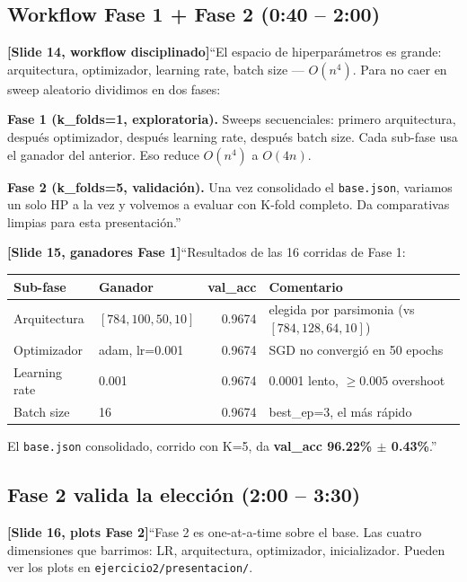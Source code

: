 \documentclass[11pt,a4paper]{article}
\newcommand{\code}[1]{\texttt{\textcolor{accent}{#1}}}
\newcommand{\file}[1]{\texttt{\small #1}}
\newcommand{\slidenum}[1]{\textcolor{accent}{\textbf{[Slide #1]}}}
\newcommand{\timing}[1]{\textcolor{muted}{\small (#1)}}
\begin{document}
\subsection{Workflow Fase 1 + Fase 2 \timing{0:40 -- 2:00}}

\slidenum{14, workflow disciplinado}\quad ``El espacio de hiperparámetros es grande: arquitectura, optimizador, learning rate, batch size --- $O(n^4)$. Para no caer en sweep aleatorio dividimos en dos fases:

\textbf{Fase 1 (k\_folds=1, exploratoria).} Sweeps secuenciales: primero arquitectura, después optimizador, después learning rate, después batch size. Cada sub-fase usa el ganador del anterior. Eso reduce $O(n^4)$ a $O(4n)$.

\textbf{Fase 2 (k\_folds=5, validación).} Una vez consolidado el \code{base.json}, variamos un solo HP a la vez y volvemos a evaluar con K-fold completo. Da comparativas limpias para esta presentación.''

\slidenum{15, ganadores Fase 1}\quad ``Resultados de las 16 corridas de Fase 1:

\begin{center}
\small
\begin{tabular}{@{}llrl@{}}
\toprule
Sub-fase & Ganador & val\_acc & Comentario \\
\midrule
Arquitectura  & $[784,100,50,10]$ & 0.9674 & elegida por parsimonia (vs $[784,128,64,10]$) \\
Optimizador   & adam, lr=0.001    & 0.9674 & SGD no convergió en 50 epochs \\
Learning rate & 0.001             & 0.9674 & 0.0001 lento, $\geq 0.005$ overshoot \\
Batch size    & 16                & 0.9674 & best\_ep=3, el más rápido \\
\bottomrule
\end{tabular}
\end{center}

El \code{base.json} consolidado, corrido con K=5, da \textbf{val\_acc 96.22\% $\pm$ 0.43\%}.''

\subsection{Fase 2 valida la elección \timing{2:00 -- 3:30}}

\slidenum{16, plots Fase 2}\quad ``Fase 2 es one-at-a-time sobre el base. Las cuatro dimensiones que barrimos: LR, arquitectura, optimizador, inicializador. Pueden ver los plots en \file{ejercicio2/presentacion/}.
\end{document}
